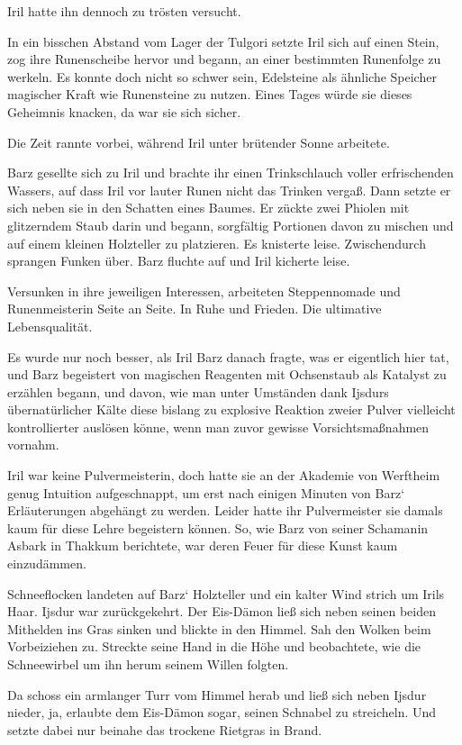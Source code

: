 Iril hatte ihn dennoch zu trösten versucht.

In ein bisschen Abstand vom Lager der Tulgori setzte Iril sich auf einen Stein, zog ihre Runenscheibe hervor und begann, an einer bestimmten Runenfolge zu werkeln. Es konnte doch nicht so schwer sein, Edelsteine als ähnliche Speicher magischer Kraft wie Runensteine zu nutzen. Eines Tages würde sie dieses Geheimnis knacken, da war sie sich sicher.

Die Zeit rannte vorbei, während Iril unter brütender Sonne arbeitete.

Barz gesellte sich zu Iril und brachte ihr einen Trinkschlauch voller erfrischenden Wassers, auf dass Iril vor lauter Runen nicht das Trinken vergaß. Dann setzte er sich neben sie in den Schatten eines Baumes. Er zückte zwei Phiolen mit glitzerndem Staub darin und begann, sorgfältig Portionen davon zu mischen und auf einem kleinen Holzteller zu platzieren. Es knisterte leise. Zwischendurch sprangen Funken über. Barz fluchte auf und Iril kicherte leise.

Versunken in ihre jeweiligen Interessen, arbeiteten Steppennomade und Runenmeisterin Seite an Seite. In Ruhe und Frieden. Die ultimative Lebensqualität.

Es wurde nur noch besser, als Iril Barz danach fragte, was er eigentlich hier tat, und Barz begeistert von magischen Reagenten mit Ochsenstaub als Katalyst zu erzählen begann, und davon, wie man unter Umständen dank Ijsdurs übernatürlicher Kälte diese bislang zu explosive Reaktion zweier Pulver vielleicht kontrollierter auslösen könne, wenn man zuvor gewisse Vorsichtsmaßnahmen vornahm.

Iril war keine Pulvermeisterin, doch hatte sie an der Akademie von Werftheim genug Intuition aufgeschnappt, um erst nach einigen Minuten von Barz‘ Erläuterungen abgehängt zu werden. Leider hatte ihr Pulvermeister sie damals kaum für diese Lehre begeistern können. So, wie Barz von seiner Schamanin Asbark in Thakkum berichtete, war deren Feuer für diese Kunst kaum einzudämmen.

Schneeflocken landeten auf Barz‘ Holzteller und ein kalter Wind strich um Irils Haar. Ijsdur war zurückgekehrt. Der Eis-Dämon ließ sich neben seinen beiden Mithelden ins Gras sinken und blickte in den Himmel. Sah den Wolken beim Vorbeiziehen zu. Streckte seine Hand in die Höhe und beobachtete, wie die Schneewirbel um ihn herum seinem Willen folgten.

Da schoss ein armlanger Turr vom Himmel herab und ließ sich neben Ijsdur nieder, ja, erlaubte dem Eis-Dämon sogar, seinen Schnabel zu streicheln. Und setzte dabei nur beinahe das trockene Rietgras in Brand.

